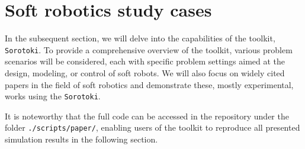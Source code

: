 
\section{Soft robotics study cases}
\label{sec:C5:studycases}
In the subsequent section, we will delve into the capabilities of the toolkit, \texttt{Sorotoki}. To provide a comprehensive overview of the toolkit, various problem scenarios will be considered, each with specific problem settings aimed at the design, modeling, or control of soft robots. We will also focus on widely cited papers in the field of soft robotics and demonstrate these, mostly experimental, works using the \texttt{Sorotoki}.
\begin{rmk}
It is noteworthy that the full code can be accessed in the repository under the folder \texttt{./scripts/paper/}, enabling users of the toolkit to reproduce all presented simulation results in the following section.
\end{rmk}
%
